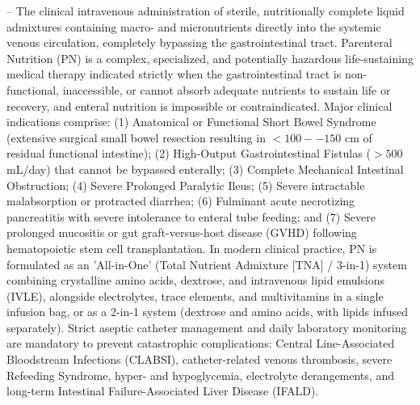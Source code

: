 -- The clinical intravenous administration of sterile, nutritionally complete liquid admixtures containing macro- and micronutrients directly into the systemic venous circulation, completely bypassing the gastrointestinal tract. Parenteral Nutrition (PN) is a complex, specialized, and potentially hazardous life-sustaining medical therapy indicated strictly when the gastrointestinal tract is non-functional, inaccessible, or cannot absorb adequate nutrients to sustain life or recovery, and enteral nutrition is impossible or contraindicated. Major clinical indications comprise: (1) Anatomical or Functional Short Bowel Syndrome (extensive surgical small bowel resection resulting in $<100--150$ cm of residual functional intestine); (2) High-Output Gastrointestinal Fistulas ($>500$ mL/day) that cannot be bypassed enterally; (3) Complete Mechanical Intestinal Obstruction; (4) Severe Prolonged Paralytic Ileus; (5) Severe intractable malabsorption or protracted diarrhea; (6) Fulminant acute necrotizing pancreatitis with severe intolerance to enteral tube feeding; and (7) Severe prolonged mucositis or gut graft-versus-host disease (GVHD) following hematopoietic stem cell transplantation. In modern clinical practice, PN is formulated as an 'All-in-One' (Total Nutrient Admixture [TNA] / 3-in-1) system combining crystalline amino acids, dextrose, and intravenous lipid emulsions (IVLE), alongside electrolytes, trace elements, and multivitamins in a single infusion bag, or as a 2-in-1 system (dextrose and amino acids, with lipids infused separately). Strict aseptic catheter management and daily laboratory monitoring are mandatory to prevent catastrophic complications: Central Line-Associated Bloodstream Infections (CLABSI), catheter-related venous thrombosis, severe Refeeding Syndrome, hyper- and hypoglycemia, electrolyte derangements, and long-term Intestinal Failure-Associated Liver Disease (IFALD).


